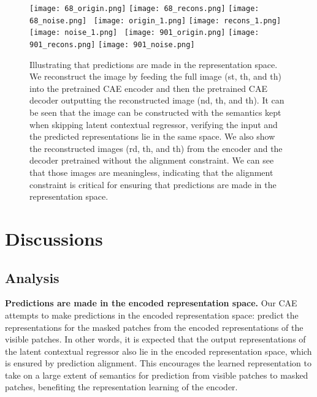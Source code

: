 \documentclass[twocolumn]{svjour3}          \smartqed  \usepackage{graphicx}
\begin{document}
\begin{figure*}
\centering
\texttt{[image: 68\_origin.png]}
\texttt{[image: 68\_recons.png]}
\texttt{[image: 68\_noise.png]}~
\texttt{[image: origin\_1.png]}
\texttt{[image: recons\_1.png]}
\texttt{[image: noise\_1.png]}~
\texttt{[image: 901\_origin.png]}
\texttt{[image: 901\_recons.png]}
\texttt{[image: 901\_noise.png]}
\caption{
Illustrating that
predictions are made
in the representation space.
We reconstruct the image 
by feeding the full image 
(st, th, and th)  into the pretrained CAE encoder
and then the pretrained CAE decoder 
outputting the reconstructed image (nd, th, and th).
It can be seen that
the image can be constructed
with the semantics kept
when skipping latent contextual regressor,
verifying the input and the predicted representations lie in the same space.
We also show the reconstructed images
(rd, th, and th)
from the encoder and the decoder
pretrained without the alignment constraint.
We can see that those images are meaningless,
indicating that the alignment constraint
is critical for ensuring 
that predictions are made
in the representation space.
}
\label{fig:nonmaskedimagereconstruction}
\end{figure*}


\section{Discussions}
\label{sec:discussionAnalysis}


\subsection{Analysis}
\noindent\textbf{Predictions
are made in the encoded representation space.}
Our CAE 
attempts to make predictions in the encoded representation space:
predict
the representations
for the masked patches
from the encoded representations of the visible patches.
In other words,
it is expected that
the output representations
of the latent contextual regressor
also lie in the encoded representation space,
which is ensured
by prediction alignment.
{This encourages the learned representation to take on a large extent of semantics for prediction
from visible patches
to masked patches, benefiting the representation learning of the encoder.}
\end{document}
